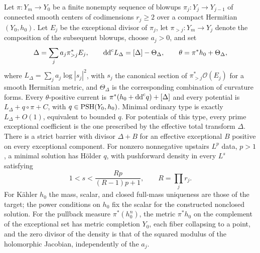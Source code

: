 \begin{theorem}\label{thm:iterated-blowups}
Let $\pi\colon Y_m\to Y_0$ be a finite nonempty sequence of blowups $\pi_j\colon Y_j\to Y_{j-1}$ of connected smooth centers of codimensions $r_j\geq2$ over a compact Hermitian $(Y_0,h_0)$. Let $E_j$ be the exceptional divisor of $\pi_j$, let $\pi_{>j}\colon Y_m\to Y_j$ denote the composition of the subsequent blowups, choose $a_j>0$, and set
\[
 \Delta=\sum_j a_j\pi_{>j}^*E_j,
 \qquad \mathrm{dd}^{\mathrm{c}} L_\Delta=[\Delta]-\Theta_\Delta,
 \qquad \theta=\pi^*h_0+\Theta_\Delta,
\]
where $L_\Delta=\sum_ja_j\log|s_j|^2$, with $s_j$ the canonical section of $\pi_{>j}^*\mathcal O(E_j)$ for a smooth Hermitian metric, and $\Theta_\Delta$ is the corresponding combination of curvature forms. Every $\theta$-positive current is $\pi^*(h_0+\mathrm{dd}^{\mathrm{c}} q)+[\Delta]$ and every potential is $L_\Delta+q\circ\pi+C$, with $q\in\mathrm{PSH}(Y_0,h_0)$. Minimal ordinary type is exactly $L_\Delta+O(1)$, equivalent to bounded $q$. For potentials of this type, every prime exceptional coefficient is the one prescribed by the effective total transform $\Delta$. There is a strict barrier with divisor $\Delta+B$ for an effective exceptional $B$ positive on every exceptional component. For nonzero nonnegative upstairs $L^p$ data, $p>1$, a minimal solution has H\"older $q$, with pushforward density in every $L^s$ satisfying
\begin{equation}\label{eq:iterated-exponent}
 1<s<\frac{Rp}{(R-1)p+1},\qquad R=\prod_jr_j.
\end{equation}
For K\"ahler $h_0$ the mass, scalar, and closed full-mass uniqueness are those of the target; the power conditions on $h_0$ fix the scalar for the constructed nonclosed solution. For the pullback measure $\pi^*(h_0^n)$, the metric $\pi^*h_0$ on the complement of the exceptional set has metric completion $Y_0$, each fiber collapsing to a point, and the zero divisor of the density is that of the squared modulus of the holomorphic Jacobian, independently of the $a_j$.
\end{theorem}

